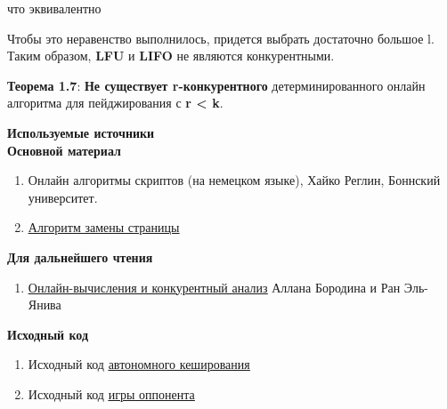 \vspace{\baselineskip}

что эквивалентно

\vspace{\baselineskip}


\vspace{\baselineskip}

Чтобы это неравенство выполнилось, придется выбрать достаточно большое l. Таким образом, \textbf{LFU} и \textbf{LIFO} не являются конкурентными.

\vspace{\baselineskip}

\newpage

\textbf{Теорема 1.7}: \textbf{Не существует r-конкурентного} детерминированного онлайн алгоритма для пейджирования с \textbf{r < k}.

\vspace{\baselineskip}

\textbf{Используемые источники} \\
\textbf{Основной материал}

\begin{enumerate}
    \item Онлайн алгоритмы скриптов (на немецком языке), Хайко Реглин, Боннский университет.
    \item \href{https://en.wikipedia.org/wiki/Page_replacement_algorithm}{\underline{Алгоритм замены страницы}}
\end{enumerate}

\textbf{Для дальнейшего чтения}

\begin{enumerate}
    \item \href{http://www.cs.technion.ac.il/~rani/book.html}{\underline{Онлайн-вычисления и конкурентный анализ}} Аллана Бородина и Ран Эль-Янива
\end{enumerate}

\textbf{Исходный код}

\begin{enumerate}
    \item Исходный код  \href{https://pastebin.com/AF7EC2xJ}{\underline{автономного кеширования}}
    \item Исходный код  \href{https://pastebin.com/u/kgoedde/1/Wak9refA}{\underline{игры оппонента}}
\end{enumerate}

